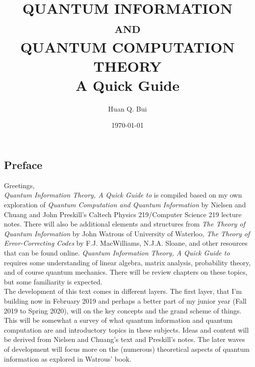 \documentclass{article}
\theoremstyle{definition}
\begin{document}
	\begin{titlepage}\centering
		\clearpage
		\title{\textsc{\bf{QUANTUM INFORMATION\\
			and\\
		QUANTUM COMPUTATION THEORY}}\\\smallskip A Quick Guide\\}
		\author{\bigskip Huan Q. Bui}
		\date{\today}
		\maketitle
		\thispagestyle{empty}
	\end{titlepage}

\newpage

\subsection*{Preface}

Greetings,\\

\textit{Quantum Information Theory, A Quick Guide to} is compiled based on my own exploration of \textit{Quantum Computation and Quantum Information} by Nielsen and Chuang and John Preskill's Caltech Physics 219/Computer Science 219 lecture notes. There will also be additional elements and structures from \textit{The Theory of Quantum Information} by John Watrous of University of Waterloo, \textit{The Theory of Error-Correcting Codes} by F.J. MacWilliams, N.J.A. Sloane, and other resources that can be found online. \textit{Quantum Information Theory, A Quick Guide to} requires some understanding of linear algebra, matrix analysis, probability theory, and of course quantum mechanics. There will be review chapters on these topics, but some familiarity is expected.  \\

The development of this text comes in different layers. The first layer, that I'm building now in February 2019 and perhaps a better part of my junior year (Fall 2019 to Spring 2020), will on the key concepts and the grand scheme of things. This will be somewhat a survey of what quantum information and quantum computation are and introductory topics in these subjects. Ideas and content will be derived from Nielsen and Chuang's text and Preskill's notes. The later waves of development will focus more on the (numerous) theoretical aspects of quantum information as explored in Watrous' book. \\
\end{document}
